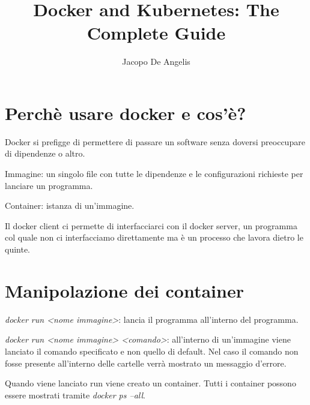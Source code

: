 \documentclass[11pt,a4paper]{book}
\begin{document}
\title{Docker and Kubernetes: The Complete Guide}
\author{Jacopo De Angelis}
\maketitle

\pagebreak
\tableofcontents
\pagebreak

\chapter{Perchè usare docker e cos'è?}
Docker si prefigge di permettere di passare un software senza doversi preoccupare di dipendenze o altro.

Immagine: un singolo file con tutte le dipendenze e le configurazioni richieste per lanciare un programma.

Container: istanza di un'immagine. 

Il docker client ci permette di interfacciarci con il docker server, un programma col quale non ci interfacciamo direttamente ma è un processo che lavora dietro le quinte.

\chapter{Manipolazione dei container}
\emph{docker run <nome immagine>}: lancia il programma all'interno del programma.

\emph{docker run <nome immagine> <comando>}: all'interno di un'immagine viene lanciato il comando specificato e non quello di default. Nel caso il comando non fosse presente all'interno delle cartelle verrà mostrato un messaggio d'errore.

Quando viene lanciato run viene creato un container. Tutti i container possono essere mostrati tramite \emph{docker ps --all}.
\end{document}
